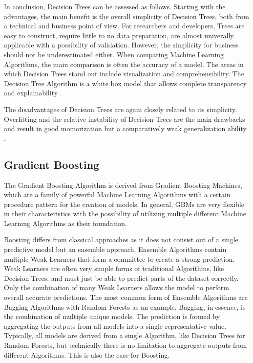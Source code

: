 In conclusion, Decision Trees can be assessed as follows. Starting with the advantages,
the main benefit is the overall simplicity of Decision Trees, both from a technical and 
business point of view. For researchers and developers, Trees are easy to construct, require little
to no data preparation, are almost univerally applicable with a possibility of validation. 
However, the simplicity for business should not be underestimated either. When comparing Machine
Learning Algorithms, the main comparison is often the accuracy of a model. The areas in which 
Decision Trees stand out include visualization and comprehensibility. The Decision Tree Algorithm 
is a white box model that allows complete transparency and explainability \cite[p.339]{James2021} \cite[10.10.]{sklearn Decision Trees}. 

The disadvantages of Decision Trees are again closely related to its simplicity. Overfitting and 
the relative instability of Decision Trees are the main drawbacks and result in good momorization 
but a comparatively weak generalization ability \cite[p.339]{James2021} \cite[10.10.]{sklearn Decision Trees}.

\subsection{Gradient Boosting}

The Gradient Boosting Algorithm is derived from Gradient Boosting Machines, which are a family of 
powerful Machine Learning Algorithms with a certain procedure pattern for the creation of models. 
In general, GBMs are very flexible in their characteristics with the possibility of utilizing 
multiple different Machine Learning Algorithms as their foundation.

Boosting differs from classical approaches as it does not consist out of a single predictive 
model but an ensemble approach. Ensemble Algorithms contain multiple Weak Learners that form a 
committee to create a strong prediction. Weak Learners are often very simple forms of traditional 
Algorithms, like Decision Trees, and must just be able to predict parts of the dataset correctly. 
Only the combination of many Weak Learners allows the model to perform overall accurate 
predictions. The most common form of Ensemble Algorithms are Bagging Algorithms with Random 
Forests as an example. Bagging, in essence, is the combination of multiple unique models. The 
prediction is formed by aggregating the outputs from all models into a single representative 
value. Typically, all models are derived from a single Algorithm, like Decision Trees for Random 
Forests, but technically there is no limitation to aggregate outputs from different Algorithms. 
This is also the case for Boosting. 

